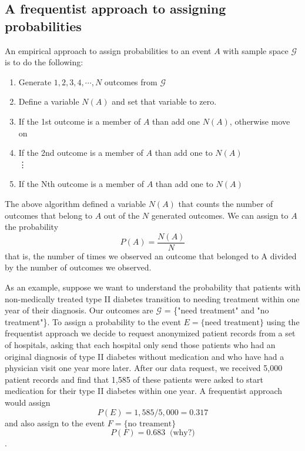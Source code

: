 \subsection{A frequentist approach to assigning probabilities}

An empirical approach to assign probabilities to an event $A$ with sample space $\mathcal{G}$ is to do the following:
\begin{enumerate}
    \item Generate $1, 2, 3, 4, \cdots, N$ outcomes from $\mathcal{G}$
    \item Define a variable $N(A)$ and set that variable to zero.
    \item If the 1st outcome is a member of $A$ than add one $N(A)$, otherwise move on
    \item If the 2nd outcome is a member of $A$ than add one to $N(A)$\\
    \vdots
    \item If the Nth outcome is a member of $A$ than add one to $N(A)$
\end{enumerate}
The above algorithm defined a variable $N(A)$ that counts the number of outcomes that belong to $A$ out of the $N$ generated outcomes.
We can assign to $A$ the probability 
\begin{equation}
    P(A) = \frac{N(A)}{N}
\end{equation}
that is, the number of times we observed an outcome that belonged to A divided by the number of outcomes we observed.

As an example, suppose we want to understand the probability that patients with non-medically treated type II diabetes transition to needing treatment within one year of their diagnosis.
Our outcomes are $\mathcal{G}$ = \{"need treatment" and "no treatment"\}. 
To assign a probability to the event $E = \{\text{need treatment}\}$ using the frequentist approach we decide to request anonymized patient records from a set of hospitals, asking that each hospital only send those patients who had an original diagnosis of type II diabetes without medication and who have had a physician visit one year more later.
After our data request, we received 5,000 patient records and find that 1,585 of these patients were asked to start medication for their type II diabetes within one year.
A frequentist approach would assign
\begin{equation}
    P(E) = 1,585/5,000 = 0.317
\end{equation}
and also assign to the event $F=\{\text{no treament}\}$
\begin{equation}
    P(F) = 0.683 \; \; \text{(why?)}
\end{equation}.


